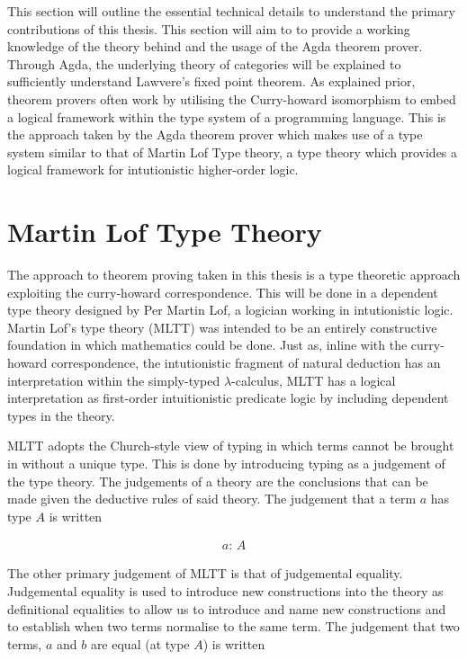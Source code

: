 This section will outline the essential technical details to understand the
primary contributions of this thesis. This section will aim to to provide a
working knowledge of the theory behind and the usage of the Agda theorem prover.
Through Agda, the underlying theory of categories will be explained to
sufficiently understand Lawvere's fixed point theorem. As explained prior,
theorem provers often work by utilising the Curry-howard isomorphism to embed a
logical framework within the type system of a programming language. This is the
approach taken by the Agda theorem prover which makes use of a type system
similar to that of Martin Lof Type theory, a type theory which provides a
logical framework for intutionistic higher-order logic.

\section{Martin Lof Type Theory}
The approach to theorem proving taken in this thesis is a type theoretic
approach exploiting the curry-howard correspondence. This will be done in a
dependent type theory designed by Per Martin Lof, a logician working in
intutionistic logic. Martin Lof's type theory (MLTT) was
intended to be an entirely constructive foundation in which mathematics could be
done. Just as, inline with the curry-howard correspondence, the intutionistic
fragment of natural deduction has an interpretation within the simply-typed
$\lambda$-calculus, MLTT has a logical interpretation as first-order
intuitionistic predicate logic by including dependent types in the theory.

MLTT adopts the Church-style view of typing in which terms cannot be brought in
without a unique type. This is done by introducing typing as a judgement of the
type theory. The judgements of a theory are the conclusions that can be made
given the deductive rules of said theory. The judgement that a term $a$ has type
$A$ is written

\begin{align*}
    a: \, A
\end{align*}

The other primary judgement of MLTT is that of judgemental equality. Judgemental
equality is used to introduce new constructions into the theory as definitional
equalities to allow us to introduce and name new constructions and to establish
when two terms normalise to the same term. The judgement that two terms,
$a$ and $b$ are equal (at type $A$) is written

